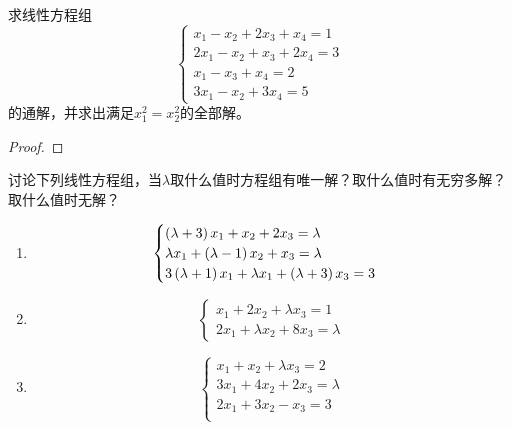 \begin{problem}\label{problem-2.3}
求线性方程组
\begin{equation*}
    \begin{cases}
        x_1-x_2+2x_3+x_4=1  \\
        2x_1-x_2+x_3+2x_4=3 \\
        x_1-x_3+x_4=2       \\
        3x_1-x_2+3x_4=5
    \end{cases}
\end{equation*}
的通解，并求出满足\(x_1^2=x_2^2\)的全部解。
\end{problem}
\begin{proof}
\end{proof}

\begin{problem}\label{problem-2.4}
讨论下列线性方程组，当\(\lambda\)取什么值时方程组有唯一解？取什么值时有无穷多解？取什么值时无解？
\begin{enumerate}
    \item \begin{equation*}
              \begin{cases}
                  \left( \lambda+3 \right)x_1+x_2+2x_3=\lambda        \\
                  \lambda x_1+\left( \lambda-1 \right)x_2+x_3=\lambda \\
                  3\left( \lambda+1 \right)x_1+\lambda x_1+\left( \lambda+3 \right)x_3=3
              \end{cases}
          \end{equation*}
    \item
          {
          \begin{equation*}
              \begin{cases}
                  x_1+2x_2+\lambda x_3=1 \\
                  2x_1+\lambda x_2+8x_3=\lambda
              \end{cases}
          \end{equation*}
          }
    \item \begin{equation*}
              \begin{cases}
                  x_1+x_2+\lambda x_3=2  \\
                  3x_1+4x_2+2x_3=\lambda \\
                  2x_1+3x_2-x_3=3        \\
              \end{cases}
          \end{equation*}
\end{enumerate}
\end{problem}
